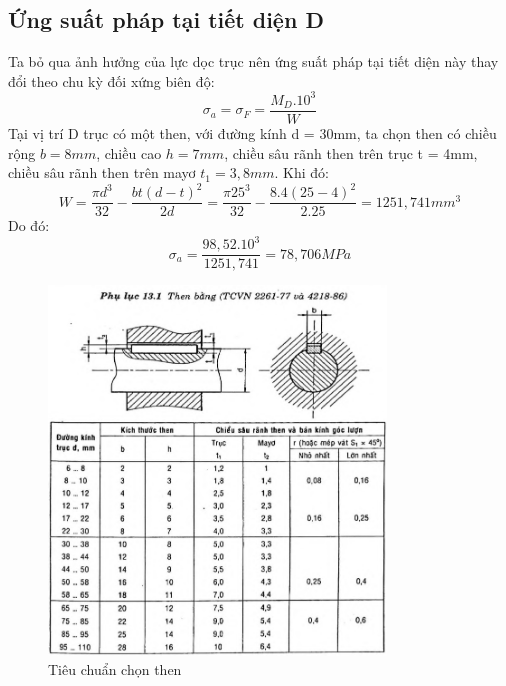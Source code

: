 \subsection{Ứng suất pháp tại tiết diện D}
Ta bỏ qua ảnh hưởng của lực dọc trục nên ứng suất pháp tại tiết diện này thay đổi theo
chu kỳ đối xứng biên độ:
\[  
    \sigma_a = \sigma_F = \frac{M_D.10^3}{W}
\]
Tại vị trí D trục có một then, với đường kính d = 30mm, ta chọn then có chiều rộng $b = 8mm$, chiều cao $h = 7mm$, chiều sâu rãnh then trên trục t = 4mm, chiều sâu rãnh then trên mayơ $t_1 = 3,8 mm$. Khi đó: 
\[
    W = \frac{\pi d^3}{32} - \frac{bt(d-t)^2}{2d} = \frac{\pi 25^3}{32} - \frac{8.4(25-4)^2}{2.25} = 1251,741mm^3
\]
Do đó:  
\[
    \sigma_a = \frac{98,52.10^3}{1251,741} = 78,706MPa
\]
\begin{figure}[H]
    \centering
    \includegraphics[width=0.8\textwidth]{pictures/then.png}
    \caption{Tiêu chuẩn chọn then}
\end{figure}
